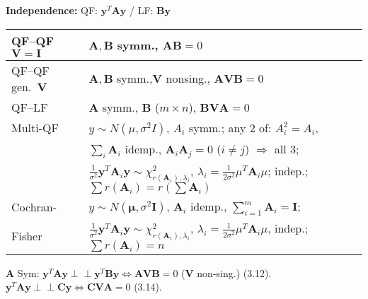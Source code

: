 \documentclass[10pt,landscape]{article}
\begin{document}
\begin{multicols}{3}
\medskip
\textbf{Independence:} QF: $\mathbf{y}^T\mathbf{A}\mathbf{y}$ / LF: $\mathbf{B}\mathbf{y}$
\begin{tabular}{|p{1.3cm}|p{5.7cm}|}
\hline
QF–QF $\mathbf{V}=\mathbf{I}$& $\mathbf{A},\mathbf{B}$ symm., $\mathbf{A}\mathbf{B}=0$\\
\hline
QF–QF gen.\ $\mathbf{V}$& $\mathbf{A},\mathbf{B}$ symm.,$\mathbf{V}$ nonsing., $\mathbf{A}\mathbf{V}\mathbf{B}=0$\\
\hline
QF–LF & $\mathbf{A}$ symm., $\mathbf{B}$ ($m\times n$), $\mathbf{B}\mathbf{V}\mathbf{A}=0$\\
\hline
Multi-QF & $y\!\sim\! N(\mu,\sigma^2{I})$, ${A}_i$ symm.; any 2 of: ${A}_i^2={A}_i$,\\
& $\sum_i \mathbf{A}_i$ idemp., $\mathbf{A}_i\mathbf{A}_j=0$ ($i\neq j$) $\Rightarrow$ all 3;\\
& $\frac{1}{\sigma^2}\mathbf{y}^T \mathbf{A}_i \mathbf{y} \sim \chi^2_{r(\mathbf{A}_i),\lambda_i}$, $\lambda_i=\frac{1}{2\sigma^2}\mu^T \mathbf{A}_i \mu$;
indep.;
$\sum r(\mathbf{A}_i)=r(\sum \mathbf{A}_i)$\\
\hline
Cochran-& $y\!\sim\! N(\boldsymbol\mu,\sigma^2\mathbf{I})$, $\mathbf{A}_i$ idemp., $\sum_{i=1}^m \mathbf{A}_i=\mathbf{I}$;\\
Fisher& $\frac{1}{\sigma^2}\mathbf{y}^T \mathbf{A}_i \mathbf{y} \sim \chi^2_{r(\mathbf{A}_i),\lambda_i}$, $\lambda_i=\frac{1}{2\sigma^2}\mu^T \mathbf{A}_i \mu$, indep.; $\sum r(\mathbf{A}_i)=n$\\
\hline
\end{tabular}

\medskip
$\mathbf{A}$ Sym:
$\mathbf{y}^T \mathbf{A} \mathbf{y} \perp\!\!\!\perp \mathbf{y}^T \mathbf{B} \mathbf{y} \Leftrightarrow \mathbf{A}\mathbf{V}\mathbf{B} = 0$ ($\mathbf{V}$ non-sing.) (3.12).
$\mathbf{y}^T \mathbf{A} \mathbf{y} \perp\!\!\!\perp \mathbf{C} \mathbf{y} \Leftrightarrow \mathbf{C}\mathbf{V}\mathbf{A} = 0$ (3.14).\\
\medskip

\end{multicols}
\end{document}
